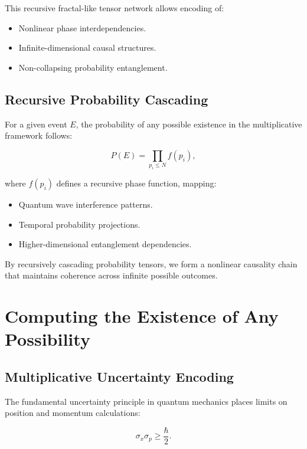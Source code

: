 \documentclass{article}
\theoremstyle{plain}
\begin{document}
This recursive fractal-like tensor network allows encoding of:

\begin{itemize}
    \item Nonlinear phase interdependencies.
    \item Infinite-dimensional causal structures.
    \item Non-collapsing probability entanglement.
\end{itemize}

\subsection{Recursive Probability Cascading}

For a given event \( E \), the probability of any possible existence in the multiplicative framework follows:

\begin{equation}
P(E) = \prod_{p_i \leq N} f(p_i),
\end{equation}

where \( f(p_i) \) defines a recursive phase function, mapping:

\begin{itemize}
    \item Quantum wave interference patterns.
    \item Temporal probability projections.
    \item Higher-dimensional entanglement dependencies.
\end{itemize}

By recursively cascading probability tensors, we form a nonlinear causality chain that maintains coherence across infinite possible outcomes.

\section{Computing the Existence of Any Possibility}

\subsection{Multiplicative Uncertainty Encoding}

The fundamental uncertainty principle in quantum mechanics places limits on position and momentum calculations:

\begin{equation}
\sigma_x \sigma_p \geq \frac{\hbar}{2}.
\end{equation}
\end{document}
